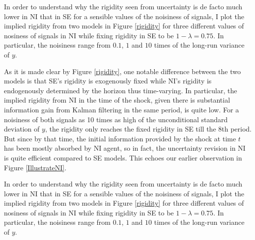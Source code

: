 \documentclass[12pt]{article}
\begin{document}
	
	
	In order to understand why the rigidity seen from uncertainty is de facto much lower in NI that in SE for a sensible values of the noisiness of signals, I plot the implied rigidity from two models in Figure \ref{rigidity} for three different values of nosiness of signals in NI while fixing rigidity in SE to be $1-\lambda =0.75$. In particular, the noisiness range from $0.1$, $1$ and $10$ times of the long-run variance of $y$. 
	
	As it is made clear by Figure \ref{rigidity}, one notable difference between the two models is that SE's rigidity is exogenously fixed while NI's rigidity is endogenously determined by the horizon thus time-varying. In particular, the implied rigidity from NI in the time of the shock, given there is substantial information gain from Kalman filtering in the same period, is quite low. For a noisiness of both signals as 10 times as high of the unconditional standard deviation of $y$, the rigidity only reaches the fixed rigidity in SE till the 8th period. But since by that time, the initial information provided by the shock at time $t$ has been mostly absorbed by NI agent, so in fact, the uncertainty revision in NI is quite efficient compared to SE models.  This echoes our earlier observation in Figure \ref{IllustrateNI}. 
	
	
	
	In order to understand why the rigidity seen from uncertainty is de facto much lower in NI that in SE for a sensible values of the noisiness of signals, I plot the implied rigidity from two models in Figure \ref{rigidity} for three different values of nosiness of signals in NI while fixing rigidity in SE to be $1-\lambda =0.75$. In particular, the noisiness range from $0.1$, $1$ and $10$ times of the long-run variance of $y$. 
	
\end{document}
